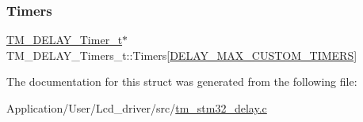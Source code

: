 \subsubsection{\texorpdfstring{Timers}{Timers}}
{\footnotesize\ttfamily \hyperlink{group___t_m___d_e_l_a_y___typedefs_gaf0beeb077a757f34c8b176464d9a0e85}{T\+M\+\_\+\+D\+E\+L\+A\+Y\+\_\+\+Timer\+\_\+t}$\ast$ T\+M\+\_\+\+D\+E\+L\+A\+Y\+\_\+\+Timers\+\_\+t\+::\+Timers\mbox{[}\hyperlink{group___t_m___d_e_l_a_y___macros_ga4430f41745879f32d4be22748ba2fbcd}{D\+E\+L\+A\+Y\+\_\+\+M\+A\+X\+\_\+\+C\+U\+S\+T\+O\+M\+\_\+\+T\+I\+M\+E\+RS}\mbox{]}}



The documentation for this struct was generated from the following file\+:\begin{DoxyCompactItemize}
\item 
Application/\+User/\+Lcd\+\_\+driver/src/\hyperlink{tm__stm32__delay_8c}{tm\+\_\+stm32\+\_\+delay.\+c}\end{DoxyCompactItemize}
